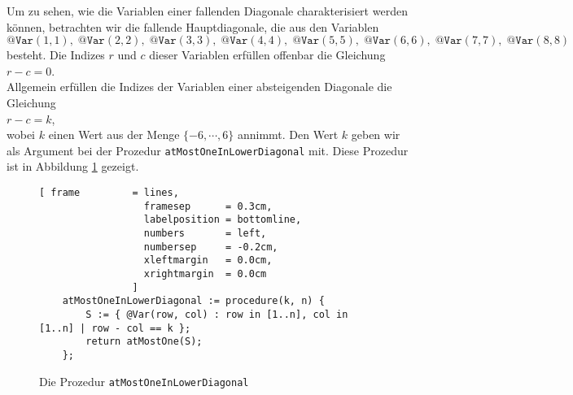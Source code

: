 Um zu sehen, wie die Variablen einer fallenden Diagonale
charakterisiert werden können, betrachten wir die fallende Hauptdiagonale, die aus den
Variablen \\[0.2cm]
\hspace*{1.3cm} 
$\texttt{@Var}(1,1),\; \texttt{@Var}(2,2),\; \texttt{@Var}(3,3),\; \texttt{@Var}(4,4),\; \texttt{@Var}(5,5),\; 
 \texttt{@Var}(6,6),\; \texttt{@Var}(7,7),\; \texttt{@Var}(8,8)$ 
\\[0.2cm]
besteht. Die Indizes  $r$ und $c$ dieser Variablen erfüllen offenbar
die Gleichung \\[0.2cm]
\hspace*{1.3cm} $r - c = 0$. \\[0.2cm]
Allgemein erfüllen die Indizes der Variablen einer absteigenden Diagonale die Gleichung \\[0.2cm]
\hspace*{1.3cm} $r - c = k$, \\[0.2cm]
wobei $k$ einen Wert aus der Menge $\{-6, \cdots, 6 \}$ annimmt.  Den Wert $k$ geben wir als Argument bei der
Prozedur \texttt{atMostOneInLowerDiagonal} mit. Diese Prozedur ist in Abbildung
\ref{fig:atMostOneInLowerDiagonal} gezeigt. 

\begin{figure}[!ht]
  \centering
\begin{Verbatim}[ frame         = lines, 
                  framesep      = 0.3cm, 
                  labelposition = bottomline,
                  numbers       = left,
                  numbersep     = -0.2cm,
                  xleftmargin   = 0.0cm,
                  xrightmargin  = 0.0cm
                ]
    atMostOneInLowerDiagonal := procedure(k, n) {
        S := { @Var(row, col) : row in [1..n], col in [1..n] | row - col == k };
        return atMostOne(S);
    };
\end{Verbatim}
\vspace*{-0.3cm}
  \caption{Die Prozedur \texttt{atMostOneInLowerDiagonal}}
  \label{fig:atMostOneInLowerDiagonal}
\end{figure}

